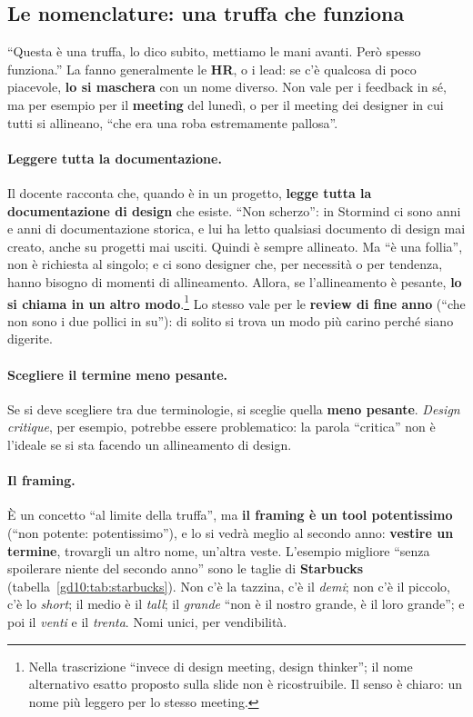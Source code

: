 \subsection{Le nomenclature: una truffa che funziona}

``Questa è una truffa, lo dico subito, mettiamo le mani avanti. Però spesso
funziona.'' La fanno generalmente le \textbf{HR}, o i lead: se c'è qualcosa
di poco piacevole, \textbf{lo si maschera} con un nome diverso. Non vale per i
feedback in sé, ma per esempio per il \textbf{meeting} del lunedì, o per il
meeting dei designer in cui tutti si allineano, ``che era una roba
estremamente pallosa''.

\paragraph{Leggere tutta la documentazione.} Il docente racconta che, quando
è in un progetto, \textbf{legge tutta la documentazione di design} che
esiste. ``Non scherzo'': in Stormind ci sono anni e anni di documentazione
storica, e lui ha letto qualsiasi documento di design mai creato, anche su
progetti mai usciti. Quindi è sempre allineato. Ma ``è una follia'', non è
richiesta al singolo; e ci sono designer che, per necessità o per tendenza,
hanno bisogno di momenti di allineamento. Allora, se l'allineamento è
pesante, \textbf{lo si chiama in un altro modo}.\footnote{Nella
trascrizione ``invece di design meeting, design thinker''; il nome
alternativo esatto proposto sulla slide non è ricostruibile. Il senso è
chiaro: un nome più leggero per lo stesso meeting.} Lo stesso vale per le
\textbf{review di fine anno} (``che non sono i due pollici in su''): di
solito si trova un modo più carino perché siano digerite.

\paragraph{Scegliere il termine meno pesante.} Se si deve scegliere tra due
terminologie, si sceglie quella \textbf{meno pesante}. \emph{Design
critique}, per esempio, potrebbe essere problematico: la parola
``critica'' non è l'ideale se si sta facendo un allineamento di design.

\paragraph{Il framing.} È un concetto ``al limite della truffa'', ma
\textbf{il framing è un tool potentissimo} (``non potente: potentissimo''),
e lo si vedrà meglio al secondo anno: \textbf{vestire un termine},
trovargli un altro nome, un'altra veste. L'esempio migliore ``senza
spoilerare niente del secondo anno'' sono le taglie di \textbf{Starbucks}
(tabella~\ref{gd10:tab:starbucks}). Non c'è la tazzina, c'è il
\emph{demi}; non c'è il piccolo, c'è lo \emph{short}; il medio è il
\emph{tall}; il \emph{grande} ``non è il nostro grande, è il loro grande''; e
poi il \emph{venti} e il \emph{trenta}. Nomi unici, per vendibilità.

